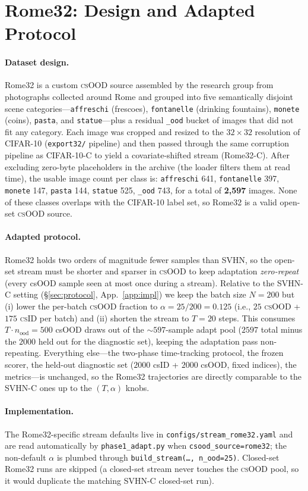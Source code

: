 \documentclass[11pt]{article}
\newcommand{\csid}{\textsc{cs}ID}
\newcommand{\csood}{\textsc{cs}OOD}
\begin{document}
\section{Rome32: Design and Adapted Protocol}\label{app:rome32}

\paragraph{Dataset design.} Rome32 is a custom \csood{} source assembled by
the research group from photographs collected around Rome and grouped into
five semantically disjoint scene categories---\texttt{affreschi} (frescoes),
\texttt{fontanelle} (drinking fountains), \texttt{monete} (coins),
\texttt{pasta}, and \texttt{statue}---plus a residual \texttt{\_ood} bucket of
images that did not fit any category. Each image was cropped and resized to
the $32\times32$ resolution of CIFAR-10 (\texttt{export32/} pipeline) and
then passed through the same corruption pipeline as CIFAR-10-C to yield a
covariate-shifted stream (Rome32-C). After excluding zero-byte placeholders
in the archive (the loader filters them at read time), the usable image
count per class is: \texttt{affreschi} 641, \texttt{fontanelle} 397,
\texttt{monete} 147, \texttt{pasta} 144, \texttt{statue} 525,
\texttt{\_ood} 743, for a total of \textbf{2{,}597} images. None of these
classes overlaps with the CIFAR-10 label set, so Rome32 is a valid open-set
\csood{} source.

\paragraph{Adapted protocol.} Rome32 holds two orders of magnitude fewer
samples than SVHN, so the open-set stream must be shorter and sparser in
\csood{} to keep adaptation \emph{zero-repeat} (every csOOD sample seen at
most once during a stream). Relative to the SVHN-C setting (\S\ref{sec:protocol},
App.~\ref{app:impl}) we keep the batch size $N{=}200$ but
(i) lower the per-batch \csood{} fraction to $\alpha=25/200=0.125$ (i.e.,
$25$ \csood{} + $175$ \csid{} per batch) and (ii) shorten the stream to
$T=20$ steps. This consumes $T\cdot n_{\text{ood}}=500$ csOOD draws out of
the $\sim597$-sample adapt pool ($2597$ total minus the $2000$ held out for
the diagnostic set), keeping the adaptation pass non-repeating. Everything
else---the two-phase time-tracking protocol, the frozen scorer, the
held-out diagnostic set ($2000$ csID + $2000$ csOOD, fixed indices), the
metrics---is unchanged, so the Rome32 trajectories are directly comparable
to the SVHN-C ones up to the $(T,\alpha)$ knobs.

\paragraph{Implementation.} The Rome32-specific stream defaults live in
\texttt{configs/stream\_rome32.yaml} and are read automatically by
\texttt{phase1\_adapt.py} when \texttt{csood\_source=rome32}; the
non-default $\alpha$ is plumbed through \texttt{build\_stream(\ldots,
n\_ood=25)}. Closed-set Rome32 runs are skipped (a closed-set stream never
touches the \csood{} pool, so it would duplicate the matching SVHN-C
closed-set run).
\end{document}
